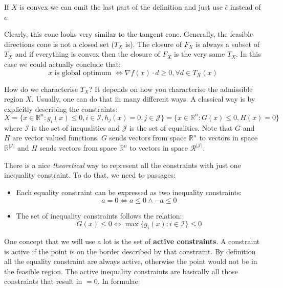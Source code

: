 \par If $X$ is convex we can omit the last part of the definition and just use $\bar \epsilon$ instead of $\epsilon$.
\par Clearly, this cone looks very similar to the tangent cone. Generally, the feasible directions cone is not a closed set ($T_X$ is). The closure of $F_X$ is always a subset of $T_X$ and if everything is convex then the closure of $F_X$ is the very same $T_X$. In this case we could actually conclude that:
\begin{equation}
    x \mbox{ is global optimum } \iff \nabla f(x) \cdot d \geq 0, \forall d \in T_X(x)
\end{equation}
\par How do we characterise $T_X$? It depends on how you characterise the admissible region $X$. Usually, one can do that in many different ways. A classical way is by explicitly describing the constraints:
\begin{equation}
    X = \{x \in \mathbb{R}^n : g_i(x) \leq 0, i \in \mathcal{I}, h_j(x) = 0, j \in \mathcal{J}\} = \{x \in \mathbb{R}^n : G(x) \leq 0, H(x) = 0\}
\end{equation}
where $\mathcal{I}$ is the set of inequalities and $\mathcal{J}$ is the set of equalities. Note that $G$ and $H$ are vector valued functions. $G$ sends vectors from space $\mathbb{R}^n$ to vectors in space $\mathbb{R}^{|\mathcal{I}|}$ and $H$ sends vectors from space $\mathbb{R}^n$ to vectors in space $\mathcal{R}^{|\mathcal{J}|}$.
\par There is a nice \textit{theoretical} way to represent all the constraints with just one inequality constraint. To do that, we need to passages:
\begin{itemize}
    \item Each equality constraint can be expressed as two inequality constraints:
    \[a = 0 \iff a \leq 0 \wedge -a \leq 0\]
    \item The set of inequality constraints follows the relation:
    \[G(x) \leq 0 \iff \max\{g_i(x) : i \in \mathcal{I}\} \leq 0\]
\end{itemize}
\par One concept that we will use a lot is the set of \textbf{active constraints}. A constraint is active if the point is on the border described by that constraint. By definition all the equality constraint are always active, otherwise the point would not be in the feasible region. The active inequality constraints are basically all those constraints that result in $=0$. In formulae:
